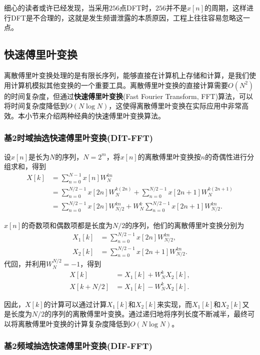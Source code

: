 细心的读者或许已经发现，当采用$256$点DFT时，$256$并不是$x[n]$的周期，这样进行DFT是不合理的，这就是发生频谱泄露的本质原因，工程上往往容易忽略这一点。

\subsection{快速傅里叶变换}\label{sub:FFT}

离散傅里叶变换处理的是有限长序列，能够直接在计算机上存储和计算，是我们使用计算机模拟其他变换的一个重要工具。离散傅里叶变换的直接计算需要$O(N^2)$的时间复杂度，但通过\textbf{快速傅里叶变换}(Fast Fourier Transform, FFT)算法，可以将时间复杂度降低到$O(N\log N)$，这使得离散傅里叶变换在实际应用中非常高效。本小节来介绍两种经典的快速傅里叶变换算法。

\subsubsection{基2时域抽选快速傅里叶变换(DIT-FFT)}

设$x[n]$是长为$N$的序列，$N=2^m$，将$x[n]$的离散傅里叶变换按$n$的奇偶性进行分组求和，得到
\begin{align}
    X[k]&=\sum_{n=0}^{N-1}x[n]W_N^{kn} \nonumber \\
    &=\sum_{n=0}^{N/2-1}x[2n]W_N^{k(2n)}+\sum_{n=0}^{N/2-1}x[2n+1]W_N^{k(2n+1)} \nonumber \\
    &=\sum_{n=0}^{N/2-1}x[2n]W_{N/2}^{kn}+W_N^{k}\sum_{n=0}^{N/2-1}x[2n+1]W_{N/2}^{kn}.\label{eq:dit_fft_decomp}
\end{align}

$x[n]$的奇数项和偶数项都是长度为$N/2$的序列，他们的离散傅里叶变换分别为
\begin{align}
    X_1[k]&=\sum_{n=0}^{N/2-1}x[2n]W_{N/2}^{kn}, \\
    X_2[k]&=\sum_{n=0}^{N/2-1}x[2n+1]W_{N/2}^{kn}.
\end{align}
代回，并利用$W_N^{N/2}=-1$，得到
\begin{align}
    X[k]&=X_1[k]+W_N^{k}X_2[k], \\
    X[k+N/2]&=X_1[k]-W_N^{k}X_2[k].
\end{align}

因此，$X[k]$的计算可以通过计算$X_1[k]$和$X_2[k]$来实现，而$X_1[k]$和$X_2[k]$又是长度为$N/2$的序列的离散傅里叶变换。通过递归地将序列长度不断减半，最终可以将离散傅里叶变换的计算复杂度降低到$O(N\log N)$。

\subsubsection{基2频域抽选快速傅里叶变换(DIF-FFT)}

